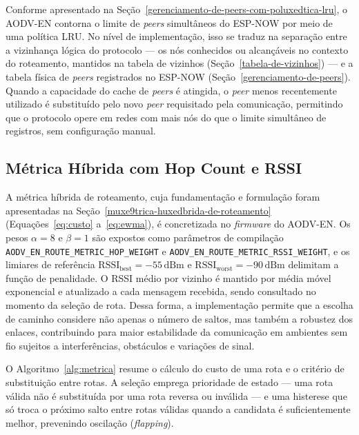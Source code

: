 Conforme apresentado na
Seção~\ref{gerenciamento-de-peers-com-poluxedtica-lru}, o AODV-EN contorna
o limite de \emph{peers} simultâneos do ESP-NOW por meio de uma política
LRU. No nível de implementação, isso se traduz na separação entre a
vizinhança lógica do protocolo --- os nós conhecidos ou alcançáveis no
contexto do roteamento, mantidos na tabela de vizinhos
(Seção~\ref{tabela-de-vizinhos}) --- e a tabela física de \emph{peers}
registrados no ESP-NOW (Seção~\ref{gerenciamento-de-peers}). Quando a
capacidade do cache de \emph{peers} é atingida, o \emph{peer} menos
recentemente utilizado é substituído pelo novo \emph{peer} requisitado
pela comunicação, permitindo que o protocolo opere em redes com mais nós
do que o limite simultâneo de registros, sem configuração manual.

\subsection{Métrica Híbrida com Hop Count e RSSI}\label{metrica-hibrida-com-hop-count-e-rssi-2}

A métrica híbrida de roteamento, cuja fundamentação e formulação foram
apresentadas na Seção~\ref{muxe9trica-huxedbrida-de-roteamento}
(Equações~\ref{eq:custo} a~\ref{eq:ewma}), é concretizada no
\emph{firmware} do AODV-EN. Os pesos $\alpha = 8$ e $\beta = 1$ são
expostos como parâmetros de compilação
\texttt{AODV\_EN\_ROUTE\_METRIC\_HOP\_WEIGHT} e
\texttt{AODV\_EN\_ROUTE\_METRIC\_RSSI\_WEIGHT}, e os limiares de
referência $\text{RSSI}_\text{best} = -55\,\text{dBm}$ e
$\text{RSSI}_\text{worst} = -90\,\text{dBm}$ delimitam a função de
penalidade. O RSSI médio por vizinho é mantido por média móvel
exponencial e atualizado a cada mensagem recebida, sendo consultado no
momento da seleção de rota. Dessa forma, a implementação permite que a
escolha de caminho considere não apenas o número de saltos, mas também a
robustez dos enlaces, contribuindo para maior estabilidade da
comunicação em ambientes sem fio sujeitos a interferências, obstáculos e
variações de sinal.

O Algoritmo~\ref{alg:metrica} resume o cálculo do custo de uma rota e o
critério de substituição entre rotas. A seleção emprega prioridade de
estado --- uma rota válida não é substituída por uma rota reversa ou
inválida --- e uma histerese que só troca o próximo salto entre rotas
válidas quando a candidata é suficientemente melhor, prevenindo
oscilação (\emph{flapping}).

